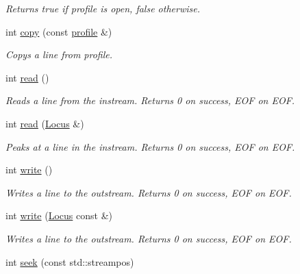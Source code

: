 \begin{DoxyCompactItemize}
\begin{DoxyCompactList}\small\item\em Returns true if profile is open, false otherwise. \end{DoxyCompactList}\item 
\hypertarget{classprofile_a36ce56a84e7800c1fbcaf75ad8d066f6}{int \hyperlink{classprofile_a36ce56a84e7800c1fbcaf75ad8d066f6}{copy} (const \hyperlink{classprofile}{profile} \&)}\label{classprofile_a36ce56a84e7800c1fbcaf75ad8d066f6}

\begin{DoxyCompactList}\small\item\em Copys a line from profile. \end{DoxyCompactList}\item 
\hypertarget{classprofile_a252b01056cdfefe54c265a6e77f9c82b}{int \hyperlink{classprofile_a252b01056cdfefe54c265a6e77f9c82b}{read} ()}\label{classprofile_a252b01056cdfefe54c265a6e77f9c82b}

\begin{DoxyCompactList}\small\item\em Reads a line from the instream. Returns 0 on success, E\-O\-F on E\-O\-F. \end{DoxyCompactList}\item 
\hypertarget{classprofile_a0d15c93306b2072be45fbebc9a23c0ce}{int \hyperlink{classprofile_a0d15c93306b2072be45fbebc9a23c0ce}{read} (\hyperlink{classLocus}{Locus} \&)}\label{classprofile_a0d15c93306b2072be45fbebc9a23c0ce}

\begin{DoxyCompactList}\small\item\em Peaks at a line in the instream. Returns 0 on success, E\-O\-F on E\-O\-F. \end{DoxyCompactList}\item 
\hypertarget{classprofile_a7dce10bed6159f785041a9b4b0099e47}{int \hyperlink{classprofile_a7dce10bed6159f785041a9b4b0099e47}{write} ()}\label{classprofile_a7dce10bed6159f785041a9b4b0099e47}

\begin{DoxyCompactList}\small\item\em Writes a line to the outstream. Returns 0 on success, E\-O\-F on E\-O\-F. \end{DoxyCompactList}\item 
int \hyperlink{classprofile_aefe45dcc6563bd3aabbcf6671a377a82}{write} (\hyperlink{classLocus}{Locus} const \&)
\begin{DoxyCompactList}\small\item\em Writes a line to the outstream. Returns 0 on success, E\-O\-F on E\-O\-F. \end{DoxyCompactList}\item 
\hypertarget{classprofile_ab58c25bc9a2b9f19c949f1eb3929443a}{int \hyperlink{classprofile_ab58c25bc9a2b9f19c949f1eb3929443a}{seek} (const std\-::streampos)}\label{classprofile_ab58c25bc9a2b9f19c949f1eb3929443a}


\end{DoxyCompactItemize}
